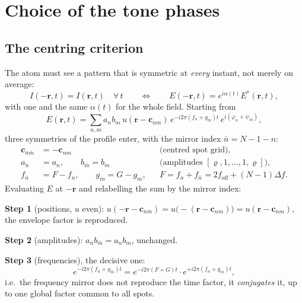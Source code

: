\section{Choice of the tone phases}
\label{app:phases}

\subsection{The centring criterion}

The atom must see a pattern that is symmetric at \emph{every} instant, not
merely on average:
\begin{equation}
I(-\mathbf{r},t)=I(\mathbf{r},t)\quad\forall\,t
\qquad\Longleftrightarrow\qquad
E(-\mathbf{r},t)=e^{i\alpha(t)}E^{*}(\mathbf{r},t),
\label{eq:app_centred}
\end{equation}
with one and the same $\alpha(t)$ for the whole field. Starting from
\begin{equation}
E(\mathbf{r},t)=\sum_{n,m}a_nb_m\,u(\mathbf{r}-\mathbf{c}_{nm})\,
e^{-i2\pi(f_n+g_m)t}\,e^{i(\varphi_n+\psi_m)},
\end{equation}
three symmetries of the profile enter, with the mirror index $\bar n=N-1-n$:
\begin{align}
\mathbf{c}_{\bar n\bar m}&=-\mathbf{c}_{nm}
&&\text{(centred spot grid)},\label{eq:app_symgeo}\\
a_{\bar n}&=a_n,\qquad b_{\bar m}=b_m
&&\text{(amplitudes }[\varrho,1,\dots,1,\varrho]\text{)},\label{eq:app_symamp}\\
f_{\bar n}&=F-f_n,\qquad g_{\bar m}=G-g_m,
&&F=f_n+f_{\bar n}=2f_\mathrm{off}+(N-1)\Delta f .\label{eq:app_symfreq}
\end{align}
Evaluating $E$ at $-\mathbf{r}$ and relabelling the sum by the mirror index:

\medskip
\noindent\textbf{Step 1} (positions, $u$ even):
$u(-\mathbf{r}-\mathbf{c}_{\bar n\bar m})
=u\big(-(\mathbf{r}-\mathbf{c}_{nm})\big)=u(\mathbf{r}-\mathbf{c}_{nm})$,
the envelope factor is reproduced.

\noindent\textbf{Step 2} (amplitudes): $a_{\bar n}b_{\bar m}=a_nb_m$, unchanged.

\noindent\textbf{Step 3} (frequencies), the decisive one:
\begin{equation}
e^{-i2\pi(f_{\bar n}+g_{\bar m})t}
=e^{-i2\pi(F+G)t}\cdot e^{+i2\pi(f_n+g_m)t},
\label{eq:app_conj}
\end{equation}
i.e.\ the frequency mirror does not reproduce the time factor, it
\emph{conjugates} it, up to one global factor common to all spots.

